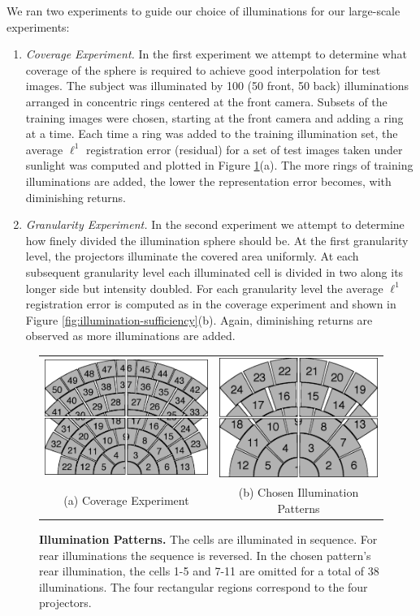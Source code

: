 \documentclass[10pt,journal,letterpaper,compsoc]{IEEEtran} %
\begin{document}
We ran two experiments to guide our choice of illuminations for
our large-scale experiments:
\begin{enumerate}
\item {\em Coverage Experiment.} In the first experiment we
    attempt to determine what coverage of the sphere is
    required to achieve good interpolation for test images.
    The subject was illuminated by 100 (50 front, 50 back)
    illuminations arranged in concentric rings centered at
    the front camera.  Subsets of the training images were
    chosen, starting at the front camera and adding a ring
    at a time.  Each time a ring was added to the training
    illumination set, the average $\ell^1$ registration
    error (residual) for a set of test images taken under
    sunlight was computed and plotted in Figure
    \ref{fig:illumination-patterns}(a).  The more rings of
    training illuminations are added, the lower the
    representation error becomes, with diminishing returns.
\item {\em Granularity Experiment.} In the second
    experiment we attempt to determine how finely divided
    the illumination sphere should be.  At the first
    granularity level, the projectors  illuminate the
    covered area uniformly.  At each subsequent granularity
    level each illuminated cell is divided in two along its
    longer side but intensity doubled.  For each
    granularity level the average $\ell^1$ registration
    error is computed as in the coverage experiment and
    shown in Figure \ref{fig:illumination-sufficiency}(b).
    Again, diminishing returns are observed as more
    illuminations are added.
\end{enumerate}
\begin{figure}
\centering
\begin{tabular}{cc}
\includegraphics[height=.75in]{figures_cvpr/coverage_experiment_asplode.png} &
\includegraphics[height=.75in]{figures_cvpr/final_cvpr_illuminations_asplode.png}  \\
(a) Coverage Experiment & (b) Chosen Illumination Patterns
\end{tabular}\vspace{0mm}
\caption{{\bf Illumination Patterns.}   The cells are illuminated in sequence.  For rear illuminations the sequence is reversed.  In the chosen pattern's rear illumination, the cells 1-5 and 7-11 are omitted for a total of 38 illuminations. The four rectangular regions correspond to the four projectors.  }
\label{fig:illumination-patterns}
\vspace{-.75em}
\end{figure}
\end{document}
